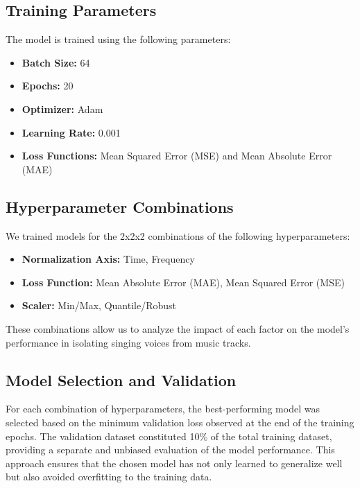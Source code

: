 \documentclass[conference]{IEEEtran}
\begin{document}
\subsection{Training Parameters}

The model is trained using the following parameters:

\begin{itemize}
    \item \textbf{Batch Size:} 64
    \item \textbf{Epochs:} 20
    \item \textbf{Optimizer:} Adam
    \item \textbf{Learning Rate:} 0.001
    \item \textbf{Loss Functions:} Mean Squared Error (MSE) and Mean Absolute Error (MAE)
\end{itemize}

\subsection{Hyperparameter Combinations}

We trained models for the 2x2x2 combinations of the following hyperparameters:

\begin{itemize}
    \item \textbf{Normalization Axis:} Time, Frequency
    \item \textbf{Loss Function:} Mean Absolute Error (MAE), Mean Squared Error (MSE)
    \item \textbf{Scaler:} Min/Max, Quantile/Robust
\end{itemize}

These combinations allow us to analyze the impact of each factor on the model's performance in isolating singing voices from music tracks.

\subsection{Model Selection and Validation}

For each combination of hyperparameters, the best-performing model was selected based on the minimum validation loss observed at the end of the training epochs. The validation dataset constituted 10\% of the total training dataset, providing a separate and unbiased evaluation of the model performance. This approach ensures that the chosen model has not only learned to generalize well but also avoided overfitting to the training data.
\end{document}
